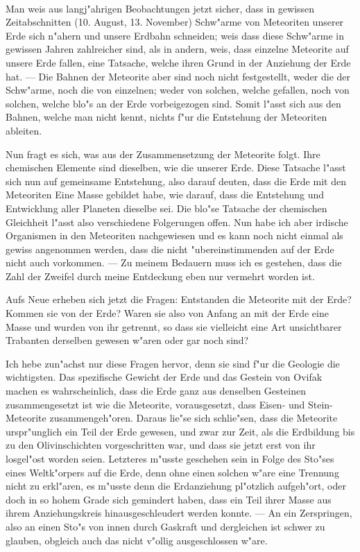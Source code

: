 \documentclass[a4paper, 11pt, oneside]{article}
\begin{document}
\paragraph{}
Man weis aus langj"ahrigen Beobachtungen jetzt sicher, dass in gewissen Zeitabschnitten (10. August, 13. November) Schw"arme von Meteoriten unserer Erde sich n"ahern und unsere Erdbahn schneiden; weis dass diese Schw"arme in gewissen Jahren zahlreicher sind, als in andern, weis, dass einzelne Meteorite auf unsere Erde fallen, eine Tatsache, welche ihren Grund in der Anziehung der Erde hat. --- Die Bahnen der Meteorite aber sind noch nicht festgestellt, weder die der Schw"arme, noch die von einzelnen; weder von solchen, welche gefallen, noch von solchen, welche blo"s an der Erde vorbeigezogen sind. Somit l"asst sich aus den Bahnen, welche man nicht kennt, nichts f"ur die Entstehung der Meteoriten ableiten.

Nun fragt es sich, was aus der Zusammensetzung der Meteorite folgt. Ihre chemischen Elemente sind dieselben, wie die unserer Erde. Diese Tatsache l"asst sich nun auf gemeinsame Entstehung, also darauf deuten, dass die Erde mit den Meteoriten Eine Masse gebildet habe, wie darauf, dass die Entstehung und Entwicklung aller Planeten dieselbe sei. Die blo"se Tatsache der chemischen Gleichheit l"asst also verschiedene Folgerungen offen. Nun habe ich aber irdische Organismen in den Meteoriten nachgewiesen und es kann noch nicht einmal als gewiss angenommen werden, dass die nicht "ubereinstimmenden auf der Erde nicht auch vorkommen. --- Zu meinem Bedauern muss ich es gestehen, dass die Zahl der Zweifel durch meine Entdeckung eben nur vermehrt worden ist.

Aufs Neue erheben sich jetzt die Fragen: Entstanden die Meteorite mit der Erde? Kommen sie von der Erde? Waren sie also von Anfang an mit der Erde eine Masse und wurden von ihr getrennt, so dass sie vielleicht eine Art unsichtbarer Trabanten derselben gewesen w"aren oder gar noch sind?

Ich hebe zun"achst nur diese Fragen hervor, denn sie sind f"ur die Geologie die wichtigsten. Das spezifische Gewicht der Erde und das Gestein von Ovifak machen es wahrscheinlich, dass die Erde ganz aus denselben Gesteinen zusammengesetzt ist wie die Meteorite, vorausgesetzt, dass Eisen- und Stein-Meteorite zusammengeh"oren. Daraus lie"se sich schlie"sen, dass die Meteorite urspr"unglich ein Teil der Erde gewesen, und zwar zur Zeit, als die Erdbildung bis zu den Olivinschichten vorgeschritten war, und dass sie jetzt erst von ihr losgel"ost worden seien. Letzteres m"usste geschehen sein in Folge des Sto"ses eines Weltk"orpers auf die Erde, denn ohne einen solchen w"are eine Trennung nicht zu erkl"aren, es m"usste denn die Erdanziehung pl"otzlich aufgeh"ort, oder doch in so hohem Grade sich gemindert haben, dass ein Teil ihrer Masse aus ihrem Anziehungskreis hinausgeschleudert werden konnte. --- An ein Zerspringen, also an einen Sto"s von innen durch Gaskraft und dergleichen ist schwer zu glauben, obgleich auch das nicht v"ollig ausgeschlossen w"are.
\end{document}

